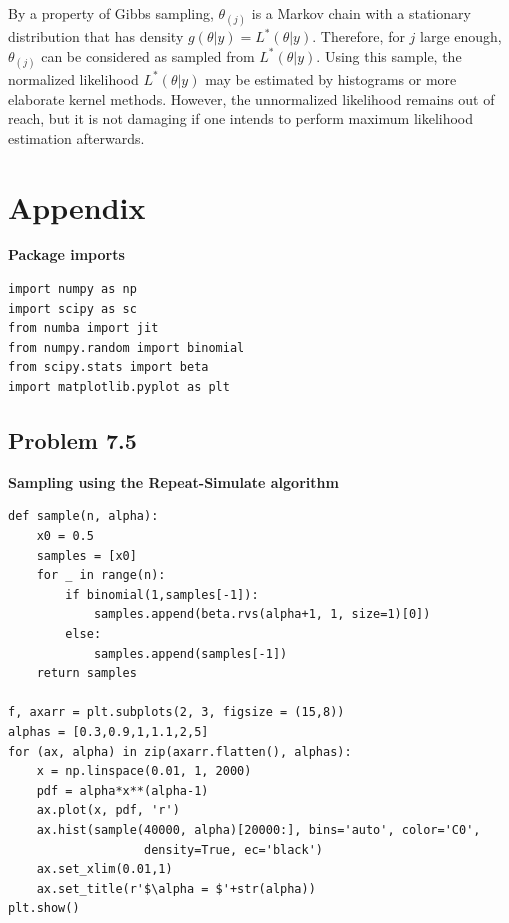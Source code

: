 \documentclass[a4paper,11pt, hidelinks]{article}
\begin{document}
\begin{enumerate}[label=(\alph*)]
    By a property of Gibbs sampling, $\theta_{(j)}$ is a Markov chain with a stationary distribution that has density $g(\theta|y) = L^*(\theta|y)$. Therefore, for $j$ large enough, $\theta_{(j)}$ can be considered as sampled from $L^*(\theta|y)$.\newline \newline
    Using this sample, the normalized likelihood $L^*(\theta|y)$ may be estimated by histograms or more elaborate kernel methods. However, the unnormalized likelihood remains out of reach, but it is not damaging if one intends to perform maximum likelihood estimation afterwards.
\end{enumerate}


\newpage
\section*{Appendix}

\textbf{Package imports}
\begin{verbatim}
import numpy as np
import scipy as sc 
from numba import jit
from numpy.random import binomial
from scipy.stats import beta
import matplotlib.pyplot as plt   
\end{verbatim}

\subsection*{Problem 7.5}
\textbf{Sampling using the Repeat-Simulate algorithm}
\begin{verbatim}
def sample(n, alpha):
    x0 = 0.5
    samples = [x0]
    for _ in range(n):
        if binomial(1,samples[-1]):
            samples.append(beta.rvs(alpha+1, 1, size=1)[0])
        else:
            samples.append(samples[-1])
    return samples

f, axarr = plt.subplots(2, 3, figsize = (15,8))
alphas = [0.3,0.9,1,1.1,2,5]
for (ax, alpha) in zip(axarr.flatten(), alphas): 
    x = np.linspace(0.01, 1, 2000)
    pdf = alpha*x**(alpha-1)
    ax.plot(x, pdf, 'r')
    ax.hist(sample(40000, alpha)[20000:], bins='auto', color='C0', 
                   density=True, ec='black')
    ax.set_xlim(0.01,1)
    ax.set_title(r'$\alpha = $'+str(alpha))
plt.show()
\end{verbatim}
\end{document}
